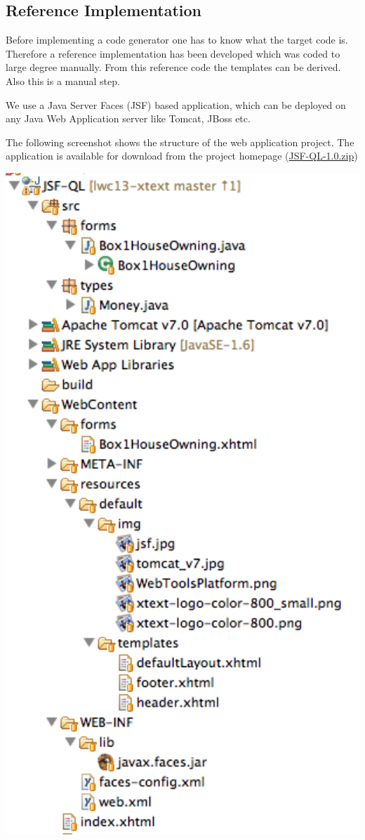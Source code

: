 \subsection{Reference Implementation}

Before implementing a code generator one has to know what the target code is. Therefore a reference implementation has been
developed which was coded to large degree manually. From this reference code the templates can be derived. Also this is a
manual step.

We use a Java Server Faces (JSF) based application, which can be deployed on any Java Web Application server like Tomcat, JBoss etc.

The following screenshot shows the structure of the web application project. The application is available for download from the project 
homepage (\href{http://lwc13-xtext.eclipselabs.org.codespot.com/files/JSF-QL-1.0.zip}{JSF-QL-1.0.zip})

\includegraphics[width=17cm]{./images/chapter02/referenceimpl_projecttree.png}


